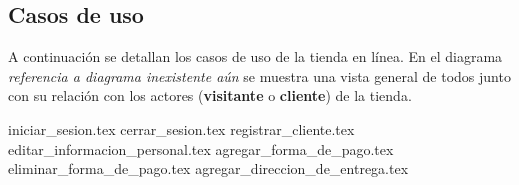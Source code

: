 %
%

\subsection{Casos de uso}

A continuación se detallan los casos de uso de la tienda en línea. En el
diagrama \textit{referencia a diagrama inexistente aún} se muestra una vista
general de todos junto con su relación con los actores (\textbf{visitante} o
\textbf{cliente}) de la tienda.


{iniciar_sesion.tex}
{cerrar_sesion.tex}
{registrar_cliente.tex}
{editar_informacion_personal.tex}
{agregar_forma_de_pago.tex}
{eliminar_forma_de_pago.tex}
{agregar_direccion_de_entrega.tex}
